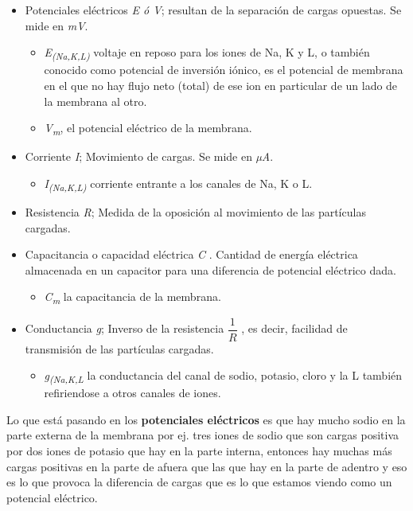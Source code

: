 \begin{itemize}
\item Potenciales eléctricos \emph{E ó  V}; resultan de la separación de cargas opuestas. Se mide en \emph{mV}.
    \begin{itemize}
     \item \emph{E\textsubscript{(Na,K,L)}} voltaje en reposo para los iones de Na, K y L, o también conocido como  potencial de inversión iónico, es el potencial de membrana en el que no hay flujo neto (total) de ese ion en particular de un lado de la membrana al otro. 
     \item \emph{V\textsubscript{m}}, el potencial eléctrico de la membrana. 
     \end{itemize}

\item Corriente \emph{I}; Movimiento de cargas. Se mide en \emph{µA}.
    \begin{itemize}
     \item \emph{I\textsubscript{(Na,K,L)}} corriente entrante a los canales de Na, K o L.
     \end{itemize}

\item Resistencia \emph{R}; Medida de la oposición al movimiento de las partículas cargadas.
\item Capacitancia o capacidad eléctrica \emph{C} . Cantidad de energía eléctrica almacenada en un capacitor para una diferencia de potencial eléctrico dada.
    \begin{itemize}
     \item \emph{C\textsubscript{m}} la capacitancia de la membrana. 
     \end{itemize}

\item Conductancia \emph{g}; Inverso de la resistencia \( \dfrac{1}{R} \) , es decir, facilidad de transmisión de las partículas cargadas.
    \begin{itemize}
     \item \emph{g\textsubscript{(Na,K,L}}  la conductancia del canal de sodio, potasio, cloro y la L también refiriendose a otros canales de iones. 
     \end{itemize}

\end{itemize}

Lo que está pasando en los \textbf{potenciales eléctricos} es que hay mucho sodio en la parte externa de la membrana por ej. tres iones de sodio que son cargas positiva por dos iones de potasio que hay en la parte interna, entonces hay muchas más cargas positivas en la parte de afuera que las que hay en la parte de adentro y eso es lo que provoca  la diferencia de cargas que es lo que estamos viendo como un  potencial eléctrico.

